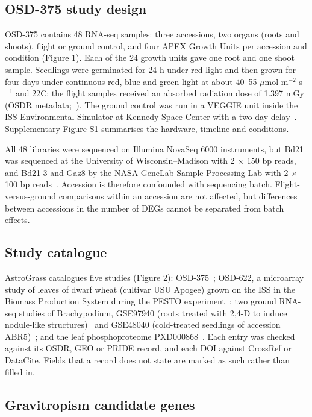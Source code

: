 \documentclass[sn-mathphys-num,Basic]{sn-jnl}
\begin{document}
\subsection{OSD-375 study design}

OSD-375 contains 48 RNA-seq samples: three accessions, two organs (roots and shoots), flight or ground control, and four APEX Growth Units per accession and condition (Figure 1). Each of the 24 growth units gave one root and one shoot sample. Seedlings were germinated for 24 h under red light and then grown for four days under continuous red, blue and green light at about 40--55 $\mu$mol m$^{-2}$ s$^{-1}$ and 22\textdegree{}C; the flight samples received an absorbed radiation dose of 1.397 mGy (OSDR metadata;~\cite{Su2023}). The ground control was run in a VEGGIE unit inside the ISS Environmental Simulator at Kennedy Space Center with a two-day delay~\cite{Su2023}. Supplementary Figure S1 summarises the hardware, timeline and conditions.

All 48 libraries were sequenced on Illumina NovaSeq 6000 instruments, but Bd21 was sequenced at the University of Wisconsin--Madison with 2 $\times$ 150 bp reads, and Bd21-3 and Gaz8 by the NASA GeneLab Sample Processing Lab with 2 $\times$ 100 bp reads~\cite{Su2023}. Accession is therefore confounded with sequencing batch. Flight-versus-ground comparisons within an accession are not affected, but differences between accessions in the number of DEGs cannot be separated from batch effects.

\subsection{Study catalogue}

AstroGrass catalogues five studies (Figure 2): OSD-375~\cite{Su2023}; OSD-622, a microarray study of leaves of dwarf wheat (cultivar USU Apogee) grown on the ISS in the Biomass Production System during the PESTO experiment~\cite{Stutte2006}; two ground RNA-seq studies of Brachypodium, GSE97940 (roots treated with 2,4-D to induce nodule-like structures)~\cite{Thomas2018} and GSE48040 (cold-treated seedlings of accession ABR5)~\cite{Zhang2013}; and the leaf phosphoproteome PXD000868~\cite{Lv2014}. Each entry was checked against its OSDR, GEO or PRIDE record, and each DOI against CrossRef or DataCite. Fields that a record does not state are marked as such rather than filled in.

\subsection{Gravitropism candidate genes}
\end{document}
